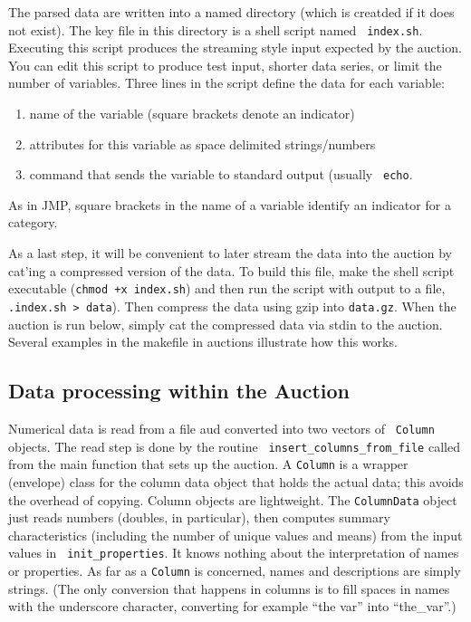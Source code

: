 \documentclass[12pt]{article}
\begin{document}
 The parsed data are written into a named directory (which is creatded if it
 does not exist).  The key file in this directory is a shell script named {\tt
 index.sh}.  Executing this script produces the streaming style input expected
 by the auction.  You can edit this script to produce test input, shorter data
 series, or limit the number of variables.  Three lines in the script define the
 data for each variable:
\begin{enumerate}
    \item  name of the variable (square brackets denote an indicator)
    \item  attributes for this variable as space delimited strings/numbers
    \item  command that sends the variable to standard output (usually {\tt
           echo}.
\end{enumerate}  
 As in JMP, square brackets in the name of a variable identify an indicator for
 a category. 

 As a last step, it will be convenient to later stream the data into the auction
 by cat'ing a compressed version of the data.  To build this file, make the
 shell script executable ({\tt chmod +x index.sh}) and then run the script with
 output to a file, {\tt .\/index.sh > data}).  Then compress the data using gzip
 into {\tt data.gz}.  When the auction is run below, simply cat the compressed
 data via stdin to the auction.  Several examples in the makefile in auctions
 illustrate how this works.


\subsection{Data processing within the Auction} 
 

 Numerical data is read from a file aud converted into two vectors of {\tt
 Column} objects.  The read step is done by the routine {\tt
 insert\_columns\_from\_file} called from the main function that sets up the
 auction.  A {\tt Column} is a wrapper (envelope) class for the column data
 object that holds the actual data; this avoids the overhead of copying.  Column
 objects are lightweight.  The {\tt ColumnData} object just reads numbers
 (doubles, in particular), then computes summary characteristics (including the
 number of unique values and means) from the input values in {\tt
 init\_properties}.  It knows nothing about the interpretation of names or
 properties.  As far as a {\tt Column} is concerned, names and descriptions are
 simply strings.  (The only conversion that happens in columns is to fill spaces
 in names with the underscore character, converting for example ``the var'' into
 ``the\_var''.)
\end{document}
